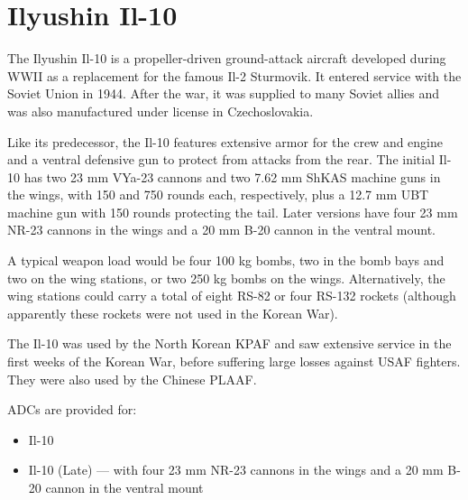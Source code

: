 \section*{Ilyushin Il-10}

The Ilyushin Il-10 is a propeller-driven ground-attack aircraft developed during WWII as a replacement for the famous Il-2 Sturmovik. It entered service with the Soviet Union in 1944. After the war, it was supplied to many Soviet allies and was also manufactured under license in Czechoslovakia.

Like its predecessor, the Il-10 features extensive armor for the crew and engine and a ventral defensive gun to protect from attacks from the rear. The initial Il-10 has two 23 mm VYa-23 cannons and two 7.62 mm ShKAS machine guns in the wings, with 150 and 750 rounds each, respectively, plus a 12.7 mm UBT machine gun with 150 rounds protecting the tail. Later versions have four 23 mm NR-23 cannons in the wings and a 20 mm B-20 cannon in the ventral mount.

A typical weapon load would be four 100 kg bombs, two in the bomb bays and two on the wing stations, or two 250 kg bombs on the wings. Alternatively, the wing stations could carry a total of eight RS-82 or four RS-132 rockets (although apparently these rockets were not used in the Korean War).

The Il-10 was used by the North Korean KPAF and saw extensive service in the first weeks of the Korean War, before suffering large losses against USAF fighters. They were also used by the Chinese PLAAF.

ADCs are provided for:
\begin{itemize}
\item Il-10
\item Il-10 (Late) --- with four 23 mm NR-23 cannons in the wings and a 20 mm B-20 cannon in the ventral mount
\end{itemize}
